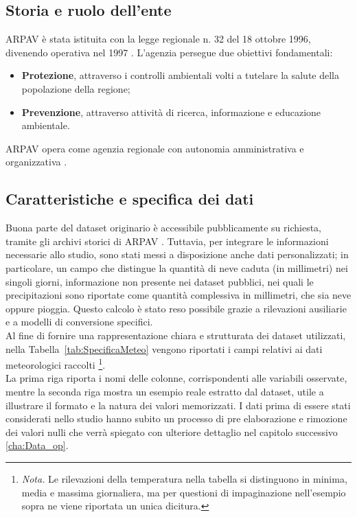 \subsection{Storia e ruolo dell’ente}
ARPAV è stata istituita con la legge regionale n. 32 del 18 ottobre 1996, divenendo operativa nel 1997 \cite{LeggeRegionale32_1996}. 
L'agenzia persegue due obiettivi fondamentali:
\begin{itemize}
    \item \textbf{Protezione}, attraverso i controlli ambientali volti a tutelare la salute della popolazione della regione;
    \item \textbf{Prevenzione}, attraverso attività di ricerca, informazione e educazione ambientale.
\end{itemize}
ARPAV opera come agenzia regionale con autonomia amministrativa e organizzativa \cite{ARPAV_Storia}. 

\subsection{Caratteristiche e specifica dei dati}
Buona parte del dataset originario è accessibile pubblicamente su richiesta, tramite gli archivi storici di ARPAV \cite{ARPAV_public}. 
Tuttavia, per integrare le informazioni necessarie allo studio, sono stati messi a disposizione anche dati personalizzati; in particolare, un campo che distingue la quantità di neve caduta (in millimetri)\cite{ARPAV_private} nei singoli giorni, informazione non presente nei dataset pubblici, nei quali le precipitazioni sono riportate come quantità complessiva in millimetri, che sia neve oppure pioggia. 
Questo calcolo è stato reso possibile grazie a rilevazioni ausiliarie e a modelli di conversione specifici.\\

Al fine di fornire una rappresentazione chiara e strutturata dei dataset utilizzati, nella Tabella~\ref{tab:SpecificaMeteo} vengono riportati i campi  relativi ai dati meteorologici raccolti \footnote{\textit{Nota.}
Le rilevazioni della temperatura nella tabella si distinguono in minima, media e massima giornaliera, ma per questioni di impaginazione nell'esempio sopra  ne viene riportata un unica dicitura.}.\\

La prima riga riporta i nomi delle colonne, corrispondenti alle variabili osservate, mentre la seconda riga mostra un esempio reale estratto dal dataset, utile a illustrare il formato e la natura dei valori memorizzati. I dati prima di essere stati considerati nello studio hanno subito un processo di pre elaborazione e rimozione dei valori nulli che verrà spiegato con ulteriore dettaglio nel capitolo successivo \ref{cha:Data_op}.

